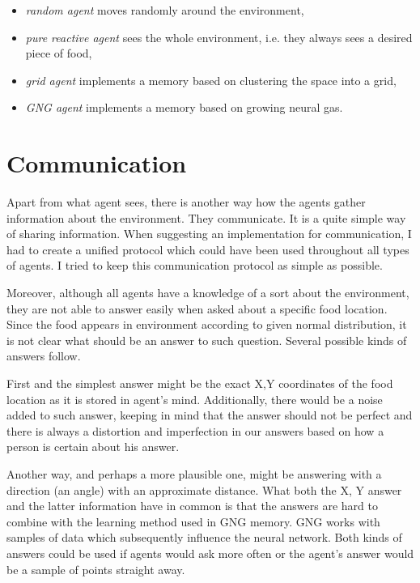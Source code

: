 \begin{itemize}
\item \emph{random agent} moves randomly around the environment,
\item \emph{pure reactive agent} sees the whole environment, i.e. they always sees a desired piece of food, 
\item \emph{grid agent} implements a memory based on clustering the space into a grid,
\item \emph{GNG agent} implements a memory based on growing neural gas.
\end{itemize}

\section{Communication}

Apart from what agent sees, there is another way how the agents gather information about the environment. They communicate. It is a quite simple way of sharing information. When suggesting an implementation for communication, I had to create a unified protocol which could have been used throughout all types of agents. I tried to keep this communication protocol as simple as possible.

Moreover, although all agents have a knowledge of a sort about the environment, they are not able to answer easily when asked about a specific food location. Since the food appears in environment according to given normal distribution, it is not clear what should be an answer to such question. Several possible kinds of answers follow. 

First and the simplest answer might be the exact X,Y coordinates of the food location as it is stored in agent's mind. Additionally, there would be a noise added to such answer, keeping in mind that the answer should not be perfect and there is always a distortion and imperfection in our answers based on how a person is certain about his answer.
                                              
Another way, and perhaps a more plausible one, might be answering with a direction (an angle) with an approximate distance. What both the X, Y answer and the latter information have in common is that the answers are hard to combine with the learning method used in GNG memory. GNG works with samples of data which subsequently influence the neural network. Both kinds of answers could be used if agents would ask more often or the agent's answer would be a sample of points straight away.

